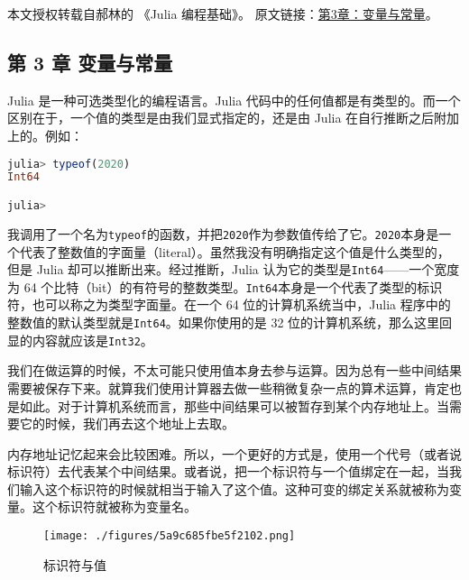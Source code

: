 
本文授权转载自郝林的 《Julia 编程基础》。 原文链接：\href{https://github.com/hyper0x/JuliaBasics/blob/master/book/ch03.md}{第3章：变量与常量}。


\subsection{第 3 章 变量与常量}

Julia 是一种可选类型化的编程语言。Julia 代码中的任何值都是有类型的。而一个区别在于，一个值的类型是由我们显式指定的，还是由 Julia 在自行推断之后附加上的。例如：

\begin{lstlisting}[language=julia]
julia> typeof(2020)
Int64

julia> 
\end{lstlisting}

我调用了一个名为\verb|typeof|的函数，并把\verb|2020|作为参数值传给了它。\verb|2020|本身是一个代表了整数值的字面量（literal）。虽然我没有明确指定这个值是什么类型的，但是 Julia 却可以推断出来。经过推断，Julia 认为它的类型是\verb|Int64|——一个宽度为 64 个比特（bit）的有符号的整数类型。\verb|Int64|本身是一个代表了类型的标识符，也可以称之为类型字面量。在一个 64 位的计算机系统当中，Julia 程序中的整数值的默认类型就是\verb|Int64|。如果你使用的是 32 位的计算机系统，那么这里回显的内容就应该是\verb|Int32|。

我们在做运算的时候，不太可能只使用值本身去参与运算。因为总有一些中间结果需要被保存下来。就算我们使用计算器去做一些稍微复杂一点的算术运算，肯定也是如此。对于计算机系统而言，那些中间结果可以被暂存到某个内存地址上。当需要它的时候，我们再去这个地址上去取。

内存地址记忆起来会比较困难。所以，一个更好的方式是，使用一个代号（或者说标识符）去代表某个中间结果。或者说，把一个标识符与一个值绑定在一起，当我们输入这个标识符的时候就相当于输入了这个值。这种可变的绑定关系就被称为变量。这个标识符就被称为变量名。

\begin{figure}[ht]
\centering
\texttt{[image: ./figures/5a9c685fbe5f2102.png]}
\caption{标识符与值} \label{fig_JuC3S0_1}
\end{figure}